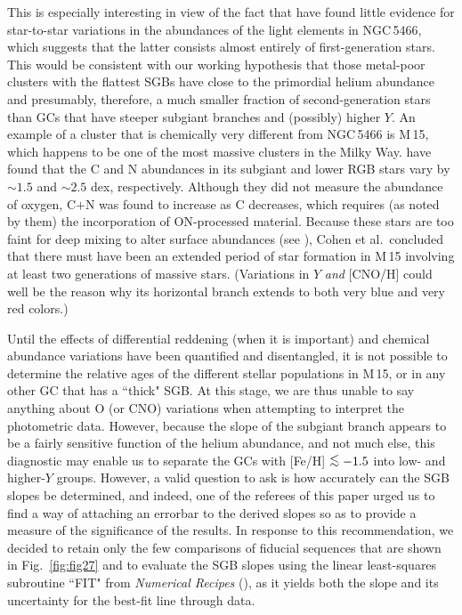 \documentclass[12pt,preprint]{aastex}
\newcommand\lta{\mathrel{\hbox{\raise 0.6 ex \hbox{$<$}\kern
                   -1.8 ex\lower .5 ex\hbox{$\sim$}}}}
\begin{document}
This is especially interesting in view of the fact that \citet{smw10} have found
little evidence for star-to-star variations in the abundances of the light
elements in NGC$\,$5466, which suggests that the latter consists almost entirely
of first-generation stars.  This would be consistent with our working hypothesis
that those metal-poor clusters with the flattest SGBs have close to the
primordial helium abundance and presumably, therefore, a much smaller fraction
of second-generation stars than GCs that have steeper subgiant branches and
(possibly) higher $Y$.  An example of a cluster that is chemically very
different from NGC$\,$5466 is M$\,$15, which happens to be one of the most
massive clusters in the Milky Way.  \citet{cbs05} have found that the C and N
abundances in its subgiant and lower RGB stars vary by $\sim 1.5$ and $\sim 2.5$
dex, respectively.  Although they did not measure the abundance of oxygen, C$+$N
was found to increase as C decreases, which requires (as noted by them) the
incorporation of ON-processed material.  Because these stars are too faint for
deep mixing to alter surface abundances (see \citealt{dv03}), Cohen et
al.~concluded that there must have been an extended period of star formation in
M$\,$15 involving at least two generations of massive stars.  (Variations in
$Y$ {\it and} [CNO/H] could well be the reason why its horizontal branch extends
to both very blue and very red colors.)

Until the effects of differential reddening (when it is important) and chemical
abundance variations have been quantified and disentangled, it is not possible
to determine the relative ages of the different stellar populations in M$\,$15,
or in any other GC that has a ``thick" SGB.  At this stage, we are thus unable
to say anything about O (or CNO) variations when attempting to interpret the
photometric data.  However, because the slope of the subgiant branch appears to
be a fairly sensitive function of the helium abundance, and not much else, this
diagnostic may enable us to separate the GCs with [Fe/H] $\lta -1.5$ into low-
and higher-$Y$ groups.  However, a valid question to ask is how accurately can
the SGB slopes be determined, and indeed, one of the referees of this paper
urged us to find a way of attaching an errorbar to the derived slopes so as to
provide a measure of the significance of the results.  In response to this
recommendation, we decided to retain only the few comparisons of fiducial
sequences that are shown in Fig.~\ref{fig:fig27} and to evaluate the SGB slopes
using the linear least-squares subroutine ``FIT" from {\it Numerical Recipes}
(\citealt{pft86}), as it yields both the slope and its uncertainty for the
best-fit line through data.
\end{document}
